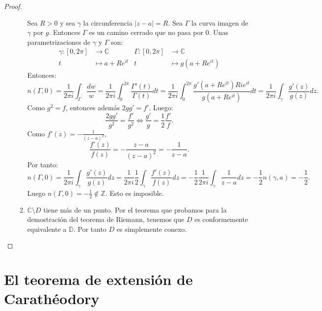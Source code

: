 \begin{proof}
\begin{itemize}
\begin{enumerate}
                      Sea $R > 0$ y sea $\gamma$ la circunferencia $|z-a| = R$.
                      Sea $\Gamma$ la curva imagen de $\gamma$ por $g$.
                      Entonces $\Gamma$ es un camino cerrado que no pasa por 0.
                      Unas parametrizaciones de $\gamma$ y $\Gamma$ son:
                      \begin{align*}
                          \gamma: [0, 2\pi] & \to \mathbb{C}      & \Gamma: [0, 2\pi] & \to \mathbb{C}         \\
                          t                 & \mapsto a + Re^{it} & t                 & \mapsto g(a + Re^{it})
                      \end{align*}
                      Entonces:
                      $$n(\Gamma, 0) = \frac{1}{2\pi i} \int_\Gamma \frac{dw}{w} = \frac{1}{2\pi i} \int_0^{2\pi} \frac{\Gamma'(t)}{\Gamma(t)}dt = \frac{1}{2\pi i} \int_0^{2\pi} \frac{g'(a + Re^{it})Rie^{it}}{g(a + Re^{it})}dt = \frac{1}{2\pi i} \int_\gamma \frac{g'(z)}{g(z)}dz.$$
                      Como $g^2 = f$, entonces además $2gg' = f'$.
                      Luego:
                      $$\frac{2gg'}{g^2} = \frac{f'}{g^2} \Leftrightarrow \frac{g'}{g} = \frac{1}{2}\frac{f'}{f}.$$
                      Como $f'(z) = -\frac{1}{(z-a)^2}$,
                      $$\frac{f'(z)}{f(z)} = -\frac{z-a}{(z-a)^2} = -\frac{1}{z-a}.$$
                      Por tanto:
                      $$n(\Gamma, 0) = \frac{1}{2\pi i} \int_\gamma \frac{g'(z)}{g(z)}dz = \frac{1}{2\pi i}\frac{1}{2} \int_\gamma \frac{f'(z)}{f(z)}dz = -\frac{1}{2}\frac{1}{2\pi i} \int_\gamma \frac{1}{z-a}dz = -\frac{1}{2}n(\gamma, a) = -\frac{1}{2}.$$
                      Luego $n(\Gamma, 0) = -\frac{1}{2} \notin \mathbb{Z}$.
                      Esto es imposible.

                \item $\mathbb{C} \setminus D$ tiene más de un punto.
                      Por el teorema que probamos para la demostración del teorema de Riemann, tenemos que $D$ es conformemente equivalente a $\mathbb{D}$.
                      Por tanto $D$ es simplemente conexo.
            \end{enumerate}
    \end{itemize}
\end{proof}

\section{El teorema de extensión de Carathéodory}

